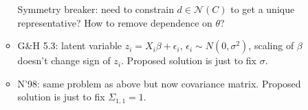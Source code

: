 \documentclass{article}
\begin{document}
\begin{itemize}
\begin{itemize}
Symmetry breaker: need to constrain $d\in\mathcal{N}(C)$ to get a unique representative? How to remove dependence on $\theta$?

\item
G\&H 5.3: latent variable $z_i=X_i\beta+\epsilon_i$, $\epsilon_i\sim N(0,\sigma^2)$, scaling of $\beta$ doesn't change sign of $z_i$. Proposed solution is just to fix $\sigma$.

\item
N'98: same problem as above but now covariance matrix. Proposed solution is just to fix $\Sigma_{1,1}=1$.

\end{itemize}

\end{itemize}
\end{document}
